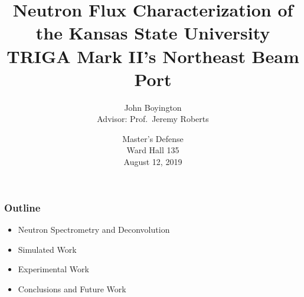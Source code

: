\documentclass[fleqn]{beamer}
\title[KSU Beam Characterization]{Neutron Flux Characterization of the Kansas State University TRIGA Mark II's Northeast Beam Port}
\author[John Boyington]{
    John Boyington\\
    Advisor: Prof.~Jeremy Roberts}
\institute[Kansas State University]{
    Department of Mechanical and Nuclear Engineering \\
    Kansas State University}
\date[Master's Defense]{
    Master's Defense\\
    Ward Hall 135\\
    August 12, 2019}
\begin{document}
\newcommand{\beginbackup}{
    \newcounter{framenumbervorappendix}
    \setcounter{framenumbervorappendix}{\value{framenumber}}
}
\newcommand{\backupend}{
    \addtocounter{framenumbervorappendix}{-\value{framenumber}}
    \addtocounter{framenumber}{\value{framenumbervorappendix}}
}



\begin{frame}
\titlepage
\end{frame}

\begin{frame}
\frametitle{Outline}
\begin{itemize}
\item Neutron Spectrometry and Deconvolution
\item Simulated Work
\item Experimental Work
\item Conclusions and Future Work
\end{itemize}
\end{frame}




\end{document}
